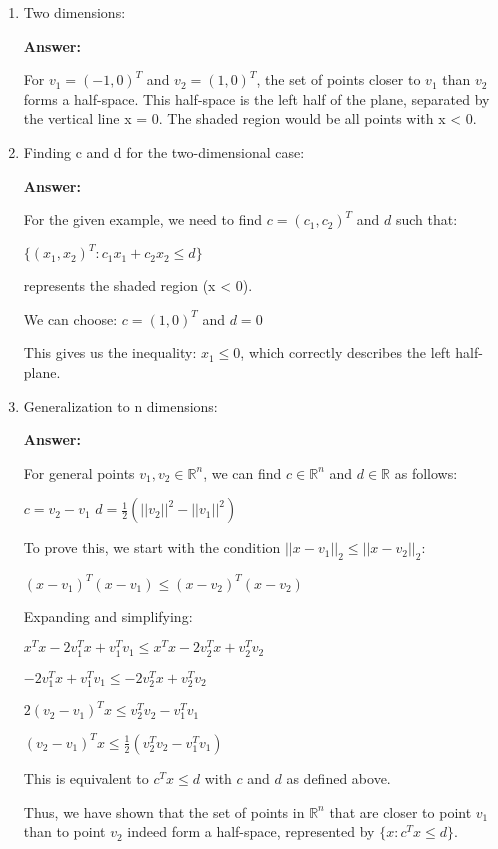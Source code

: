 \documentclass{article}
\newenvironment{answer}
    {\par\noindent\textbf{Answer:}\par}
    {\par}
\begin{document}
\begin{enumerate}
    \item Two dimensions:
    \begin{answer}
    For $v_1 = (-1, 0)^T$ and $v_2 = (1, 0)^T$, the set of points closer to $v_1$ than $v_2$ forms a half-space. This half-space is the left half of the plane, separated by the vertical line x = 0. The shaded region would be all points with x < 0.
    \end{answer}

    \item Finding c and d for the two-dimensional case:
    \begin{answer}
    For the given example, we need to find $c = (c_1, c_2)^T$ and $d$ such that:
    
    $\{(x_1, x_2)^T : c_1x_1 + c_2x_2 \leq d\}$
    
    represents the shaded region (x < 0).
    
    We can choose:
    $c = (1, 0)^T$ and $d = 0$
    
    This gives us the inequality: $x_1 \leq 0$, which correctly describes the left half-plane.
    \end{answer}

    \item Generalization to n dimensions:
    \begin{answer}
    For general points $v_1, v_2 \in \mathbb{R}^n$, we can find $c \in \mathbb{R}^n$ and $d \in \mathbb{R}$ as follows:
    
    $c = v_2 - v_1$
    $d = \frac{1}{2}(||v_2||^2 - ||v_1||^2)$
    
    To prove this, we start with the condition $||x - v_1||_2 \leq ||x - v_2||_2$:
    
    $(x - v_1)^T(x - v_1) \leq (x - v_2)^T(x - v_2)$
    
    Expanding and simplifying:
    
    $x^Tx - 2v_1^Tx + v_1^Tv_1 \leq x^Tx - 2v_2^Tx + v_2^Tv_2$
    
    $-2v_1^Tx + v_1^Tv_1 \leq -2v_2^Tx + v_2^Tv_2$
    
    $2(v_2 - v_1)^Tx \leq v_2^Tv_2 - v_1^Tv_1$
    
    $(v_2 - v_1)^Tx \leq \frac{1}{2}(v_2^Tv_2 - v_1^Tv_1)$
    
    This is equivalent to $c^Tx \leq d$ with $c$ and $d$ as defined above.
    
    Thus, we have shown that the set of points in $\mathbb{R}^n$ that are closer to point $v_1$ than to point $v_2$ indeed form a half-space, represented by $\{x : c^Tx \leq d\}$.
    \end{answer}
\end{enumerate}
\end{document}
